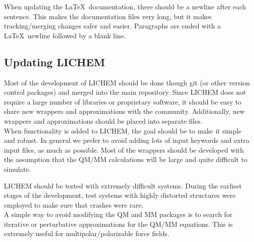 \documentclass[12pt]{report}
\begin{document}
When updating the \LaTeX\ documentation, there should be a newline after each
sentence.
This makes the documentation files very long, but it makes tracking/merging
changes safer and easier.
Paragraphs are ended with a \LaTeX\ newline followed by a blank line.

\subsection{Updating LICHEM}

Most of the development of LICHEM should be done though git (or other version
control packages) and merged into the main repository.
Since LICHEM does not require a large number of libraries or proprietary
software, it should be easy to share new wrappers and approximations with the
community.
Additionally, new wrappers and approximations should be placed into separate
files. \\

When functionality is added to LICHEM, the goal should be to make it simple
and robust.
In general we prefer to avoid adding lots of input keywords and extra input
files, as much as possible.
Most of the wrappers should be developed with the assumption that the QM/MM
calculations will be large and quite difficult to simulate.



LICHEM should be tested with extremely difficult systems.
During the earliest stages of the development, test systems with highly
distorted structures were employed to make sure that crashes were rare. \\

A simple way to avoid modifying the QM and MM packages is to search for
iterative or perturbative approximations for the QM/MM equations.
This is extremely useful for multipolar/polarizable force fields.
\end{document}
